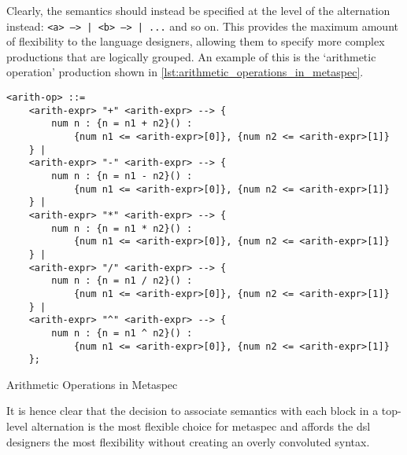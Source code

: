 Clearly, the semantics should instead be specified at the level of the alternation instead: \texttt{<a> --> {} | <b> --> {} | ...} and so on.
This provides the maximum amount of flexibility to the language designers, allowing them to specify more complex productions that are logically grouped. An example of this is the `arithmetic operation' production shown in \autoref{lst:arithmetic_operations_in_metaspec}.\\

\begin{listing}[!htb]
\begin{verbatim} 
<arith-op> ::=
    <arith-expr> "+" <arith-expr> --> {
        num n : {n = n1 + n2}() :
            {num n1 <= <arith-expr>[0]}, {num n2 <= <arith-expr>[1]}
    } |
    <arith-expr> "-" <arith-expr> --> {
        num n : {n = n1 - n2}() :
            {num n1 <= <arith-expr>[0]}, {num n2 <= <arith-expr>[1]}
    } |
    <arith-expr> "*" <arith-expr> --> {
        num n : {n = n1 * n2}() :
            {num n1 <= <arith-expr>[0]}, {num n2 <= <arith-expr>[1]}
    } |
    <arith-expr> "/" <arith-expr> --> {
        num n : {n = n1 / n2}() :
            {num n1 <= <arith-expr>[0]}, {num n2 <= <arith-expr>[1]}
    } |
    <arith-expr> "^" <arith-expr> --> {
        num n : {n = n1 ^ n2}() :
            {num n1 <= <arith-expr>[0]}, {num n2 <= <arith-expr>[1]}
    };
\end{verbatim}
\caption{Arithmetic Operations in Metaspec}
\label{lst:arithmetic_operations_in_metaspec}
\end{listing}

It is hence clear that the decision to associate semantics with each block in a top-level alternation is the most flexible choice for \gls{metaspec} and affords the \gls{dsl} designers the most flexibility without creating an overly convoluted syntax. 




